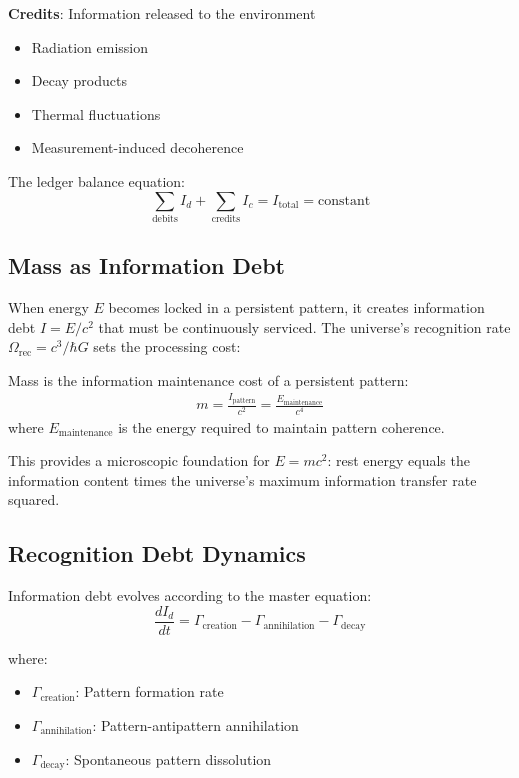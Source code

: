 \documentclass[12pt]{article}
\begin{document}
\textbf{Credits}: Information released to the environment
\begin{itemize}
\item Radiation emission
\item Decay products
\item Thermal fluctuations
\item Measurement-induced decoherence
\end{itemize}

The ledger balance equation:
\begin{equation}
\sum_{\text{debits}} I_d + \sum_{\text{credits}} I_c = I_{\text{total}} = \text{constant}
\end{equation}

\subsection{Mass as Information Debt}

When energy $E$ becomes locked in a persistent pattern, it creates information debt $I = E/c^2$ that must be continuously serviced. The universe's recognition rate $\Omega_{\text{rec}} = c^3/\hbar G$ sets the processing cost:

\begin{definition}
Mass is the information maintenance cost of a persistent pattern:
\begin{align}
m = \frac{I_{\text{pattern}}}{c^2} = \frac{E_{\text{maintenance}}}{c^4}
\end{align}
where $E_{\text{maintenance}}$ is the energy required to maintain pattern coherence.
\end{definition}

This provides a microscopic foundation for $E = mc^2$: rest energy equals the information content times the universe's maximum information transfer rate squared.

\subsection{Recognition Debt Dynamics}

Information debt evolves according to the master equation:
\begin{equation}
\frac{dI_d}{dt} = \Gamma_{\text{creation}} - \Gamma_{\text{annihilation}} - \Gamma_{\text{decay}}
\end{equation}

where:
\begin{itemize}
\item $\Gamma_{\text{creation}}$: Pattern formation rate
\item $\Gamma_{\text{annihilation}}$: Pattern-antipattern annihilation  
\item $\Gamma_{\text{decay}}$: Spontaneous pattern dissolution
\end{itemize}
\end{document}
